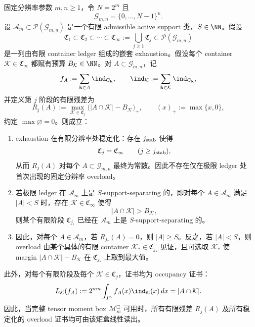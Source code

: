 \begin{theorem}\label{distill:euclid_elements-exhaustion_and_finite_budget_closure_families-spg-finite-resolution-ledger-compactness}
固定分辨率参数 \(m,n\ge 1\)，令 \(N=2^m\) 且
\[
\mathcal G_{m,n}=\{0,\ldots,N-1\}^n.
\]
设 \(\mathscr A_m\subset\mathcal P(\mathcal G_{m,n})\) 是一个有限 admissible active support 类，\(S\in\NN\)。假设
\[
\mathfrak C_1\subset\mathfrak C_2\subset\cdots\subset
\mathfrak C_\infty:=\bigcup_{j\ge1}\mathfrak C_j
\subset\mathcal P(\mathcal G_{m,n})
\]
是一列由有限 container ledger 组成的嵌套 exhaustion。假设每个 container \(\mathcal K\in\mathfrak C_\infty\) 都赋有预算 \(B_{\mathcal K}\in\NN\)。对 \(A\subset\mathcal G_{m,n}\)，记
\[
f_A:=\sum_{\mathbf k\in A}\ind_{C_{\mathbf k}},
\qquad
\ind_{\mathcal K}:=\sum_{\mathbf k\in\mathcal K}\ind_{C_{\mathbf k}},
\]
并定义第 \(j\) 阶段的有限残差为
\[
R_j(A):=\max_{\mathcal K\in\mathfrak C_j}
\bigl(|A\cap\mathcal K|-B_{\mathcal K}\bigr)_+,
\qquad (x)_+:=\max\{x,0\},
\]
约定 \(\max\varnothing=0\)。则成立：
\begin{enumerate}
  \item exhaustion 在有限分辨率处稳定化：存在 \(j_{\rm stab}\) 使得
  \[
  \mathfrak C_j=\mathfrak C_\infty\qquad(j\ge j_{\rm stab}),
  \]
  从而 \(R_j(A)\) 对每个 \(A\subset\mathcal G_{m,n}\) 最终为常数。因此不存在仅在极限 ledger 处首次出现的固定分辨率 overload。
  \item 若极限 ledger 在 \(\mathscr A_m\) 上是 \(S\)-support-separating 的，即对每个 \(A\in\mathscr A_m\) 满足 \(|A|<S\) 时，存在 \(\mathcal K\in\mathfrak C_\infty\) 使得
  \[
  |A\cap\mathcal K|>B_{\mathcal K},
  \]
  则某个有限阶段 \(\mathfrak C_{j_\ast}\) 已经在 \(\mathscr A_m\) 上是 \(S\)-support-separating 的。
  \item 因此，对每个 \(A\in\mathscr A_m\)，若 \(R_{j_\ast}(A)=0\)，则 \(|A|\ge S\)。反之，若 \(|A|<S\)，则 overload 由某个具体的有限 container \(\mathcal K_\ast\in\mathfrak C_{j_\ast}\) 见证，且可选取 \(\mathcal K_\ast\) 使 margin \(|A\cap\mathcal K|-B_{\mathcal K}\) 在 \(\mathfrak C_{j_\ast}\) 上取到最大值。
\end{enumerate}
此外，对每个有限阶段及每个 \(\mathcal K\in\mathfrak C_j\)，证书均为 occupancy 证书：
\[
L_{\mathcal K}(f_A):=2^{mn}\int_{I^n}f_A(x)\ind_{\mathcal K}(x)\,dx=|A\cap\mathcal K|.
\]
因此，当完整 tensor moment box \(\mathcal M_m^{\Box}\) 可用时，所有有限残差 \(R_j(A)\) 及所有稳定化的 overload 证书均可由该矩盒线性读出。
\end{theorem}
